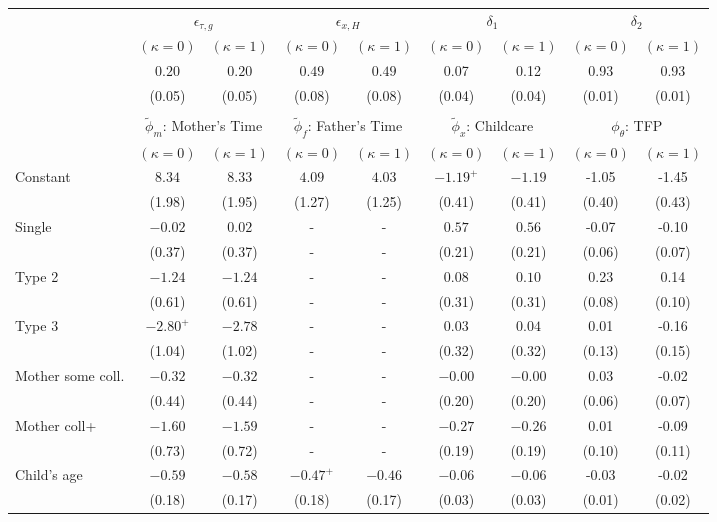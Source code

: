 \begin{tabular}{lcccccccc}\\\toprule
 & \multicolumn{2}{c}{$\epsilon_{\tau,g}$} & \multicolumn{2}{c}{$\epsilon_{x,H}$} & \multicolumn{2}{c}{$\delta_{1}$} & \multicolumn{2}{c}{$\delta_{2}$} \\
& $(\kappa=0)$ & $(\kappa=1)$ & $(\kappa=0)$ & $(\kappa=1)$ & $(\kappa=0)$ & $(\kappa=1)$ & $(\kappa=0)$ & $(\kappa=1)$ \\\cmidrule(r){2-3}\cmidrule(r){4-5}\cmidrule(r){6-7}\cmidrule(r){8-9}
&$0.20$&$0.20$&$0.49$&$0.49$&0.07&0.12&0.93&0.93\\
&(0.05)&(0.05)&(0.08)&(0.08)&(0.04)&(0.04)&(0.01)&(0.01)\\
&&&&&&&&\\
 & \multicolumn{2}{c}{$\tilde{\phi}_{m}$: Mother's Time} & \multicolumn{2}{c}{$\tilde{\phi}_{f}$: Father's Time} & \multicolumn{2}{c}{$\tilde{\phi}_{x}$: Childcare} & \multicolumn{2}{c}{$\phi_{\theta}$: TFP} \\
& $(\kappa=0)$ & $(\kappa=1)$ & $(\kappa=0)$ & $(\kappa=1)$ & $(\kappa=0)$ & $(\kappa=1)$ & $(\kappa=0)$ & $(\kappa=1)$ \\\cmidrule(r){2-3}\cmidrule(r){4-5}\cmidrule(r){6-7}\cmidrule(r){8-9}
Constant&$8.34$&$8.33$&$4.09$&$4.03$&$-1.19^{+}$&$-1.19$&-1.05&-1.45\\
&(1.98)&(1.95)&(1.27)&(1.25)&(0.41)&(0.41)&(0.40)&(0.43)\\
Single&$-0.02$&$0.02$&-&-&$0.57$&$0.56$&-0.07&-0.10\\
&(0.37)&(0.37)&-&-&(0.21)&(0.21)&(0.06)&(0.07)\\
Type 2&$-1.24$&$-1.24$&-&-&$0.08$&$0.10$&0.23&0.14\\
&(0.61)&(0.61)&-&-&(0.31)&(0.31)&(0.08)&(0.10)\\
Type 3&$-2.80^{+}$&$-2.78$&-&-&$0.03$&$0.04$&0.01&-0.16\\
&(1.04)&(1.02)&-&-&(0.32)&(0.32)&(0.13)&(0.15)\\
Mother some coll.&$-0.32$&$-0.32$&-&-&$-0.00$&$-0.00$&0.03&-0.02\\
&(0.44)&(0.44)&-&-&(0.20)&(0.20)&(0.06)&(0.07)\\
Mother coll+&$-1.60$&$-1.59$&-&-&$-0.27$&$-0.26$&0.01&-0.09\\
&(0.73)&(0.72)&-&-&(0.19)&(0.19)&(0.10)&(0.11)\\
Child's age&$-0.59$&$-0.58$&$-0.47^{+}$&$-0.46$&$-0.06$&$-0.06$&-0.03&-0.02\\
&(0.18)&(0.17)&(0.18)&(0.17)&(0.03)&(0.03)&(0.01)&(0.02)\\

\end{tabular}
